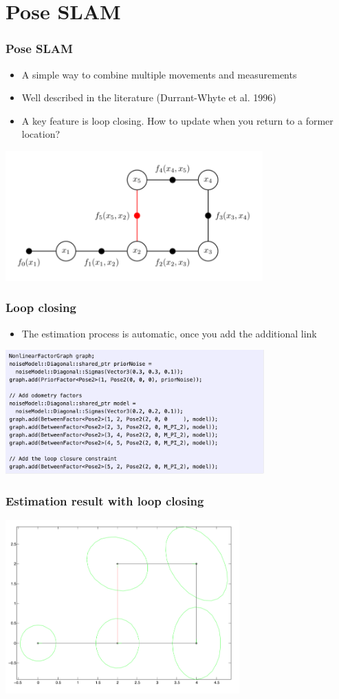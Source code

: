 \documentclass[10pt]{beamer}
\begin{document}
\section{Pose SLAM}

\begin{frame}
  \frametitle{Pose SLAM}
  \begin{itemize}
    \item A simple way to combine multiple movements and measurements
    \item Well described in the literature (Durrant-Whyte et al. 1996)
    \item A key feature is loop closing. How to update when you return to a former location?
  \end{itemize}
  \centerline{\includegraphics[height=5cm]{FactorGraph3.png}}
\end{frame}

\begin{frame}
  \frametitle{Loop closing}
  \begin{itemize}
    \item The estimation process is automatic, once you add the additional link
  \end{itemize}
  \centerline{\includegraphics[width=10cm]{loopclosing-code.png}}
\end{frame}

\begin{frame}
  \frametitle{Estimation result with loop closing}
  \centerline{\includegraphics[width=9cm]{example1.png}}
\end{frame}
\end{document}

